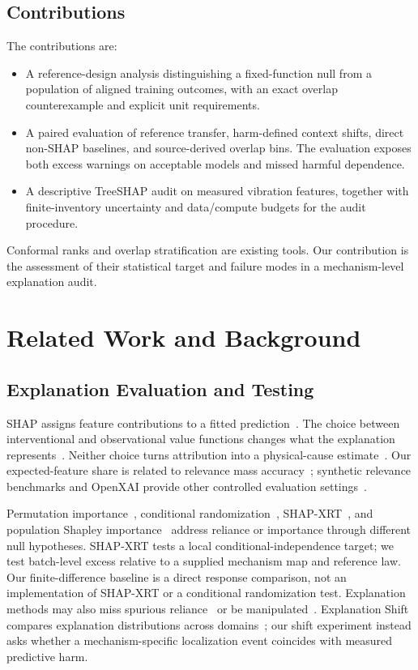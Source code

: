 \documentclass[conference]{IEEEtran}
\begin{document}
\subsection{Contributions}
The contributions are:
\begin{itemize}
\item A reference-design analysis distinguishing a fixed-function null from a population of aligned training outcomes, with an exact overlap counterexample and explicit unit requirements.
\item A paired evaluation of reference transfer, harm-defined context shifts, direct non-SHAP baselines, and source-derived overlap bins. The evaluation exposes both excess warnings on acceptable models and missed harmful dependence.
\item A descriptive TreeSHAP audit on measured vibration features, together with finite-inventory uncertainty and data/compute budgets for the audit procedure.
\end{itemize}
Conformal ranks and overlap stratification are existing tools. Our contribution is the assessment of their statistical target and failure modes in a mechanism-level explanation audit.

\section{Related Work and Background}
\label{sec:background}
\subsection{Explanation Evaluation and Testing}
SHAP assigns feature contributions to a fitted prediction~\cite{lundberg2017shap}. The choice between interventional and observational value functions changes what the explanation represents~\cite{chen2020true,sundararajan2020many,janzing2020feature}. Neither choice turns attribution into a physical-cause estimate~\cite{kumar2020problems}. Our expected-feature share is related to relevance mass accuracy~\cite{arras2022clevr}; synthetic relevance benchmarks and OpenXAI provide other controlled evaluation settings~\cite{liu2021synthetic,agarwal2022openxai}.

Permutation importance~\cite{altmann2010permutation}, conditional randomization~\cite{candes2018panning}, SHAP-XRT~\cite{teneggi2023shapxrt}, and population Shapley importance~\cite{williamson2020shapley} address reliance or importance through different null hypotheses. SHAP-XRT tests a local conditional-independence target; we test batch-level excess relative to a supplied mechanism map and reference law. Our finite-difference baseline is a direct response comparison, not an implementation of SHAP-XRT or a conditional randomization test. Explanation methods may also miss spurious reliance~\cite{adebayo2022spurious} or be manipulated~\cite{slack2020fooling}. Explanation Shift compares explanation distributions across domains~\cite{mougan2025shift}; our shift experiment instead asks whether a mechanism-specific localization event coincides with measured predictive harm.
\end{document}
